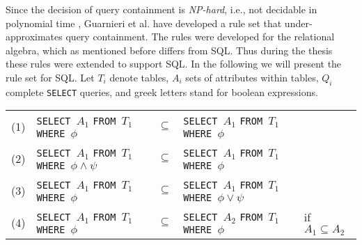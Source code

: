 Since the decision of query containment is \emph{NP-hard}, i.e., not decidable in polynomial time ,   Guarnieri et al. have developed a rule set that under-approximates query containment.
%
The rules were developed for the relational algebra, which as mentioned before differs from SQL. 
%
Thus during the thesis these rules were extended to support SQL. 
%
In the following we will present the rule set for SQL. 
%
Let $T_i$ denote tables, $A_i$ sets of attributes within tables, $Q_i$ complete  \texttt{SELECT} queries, and greek letters stand for boolean expressions.
\newline
{\renewcommand{\arraystretch}{1.5}
\begin{center}
	\begin{longtable}{ p{5mm} p{40mm} p{5mm} p{25mm} p{25mm} }
	(1) \label{id} &
	\texttt{SELECT $A_1$} \newline
	\texttt{FROM $T_1$} \newline
	\texttt{WHERE $\phi$} &
	$\subseteq$ &
	\texttt{SELECT $A_1$} \newline
	\texttt{FROM $T_1$} \newline
	\texttt{WHERE $\phi$}&
	\\

	(2) \label{and} &
	\texttt{SELECT $A_1$} \newline
	\texttt{FROM $T_1$} \newline
	\texttt{WHERE $\phi \land \psi$} &
	$\subseteq$ &
	\texttt{SELECT $A_1$} \newline
	\texttt{FROM $T_1$} \newline
	\texttt{WHERE $\phi$}&
	\\
	
	(3) \label{or} &
	\texttt{SELECT $A_1$} \newline
	\texttt{FROM $T_1$} \newline
	\texttt{WHERE $\phi$} &
	$\subseteq$ &
	\texttt{SELECT $A_1$} \newline
	\texttt{FROM $T_1$} \newline
	\texttt{WHERE $\phi \lor \psi$}&
	\\
	
	(4) \label{proj} &
	\texttt{SELECT $A_1$} \newline
	\texttt{FROM $T_1$} \newline
	\texttt{WHERE $\phi$} &
	$\subseteq$ &
	\texttt{SELECT $A_2$} \newline
	\texttt{FROM $T_1$} \newline
	\texttt{WHERE $\phi$}&
	if $A_1 \subseteq A_2$
	\\
	

\end{longtable}
\end{center}}
